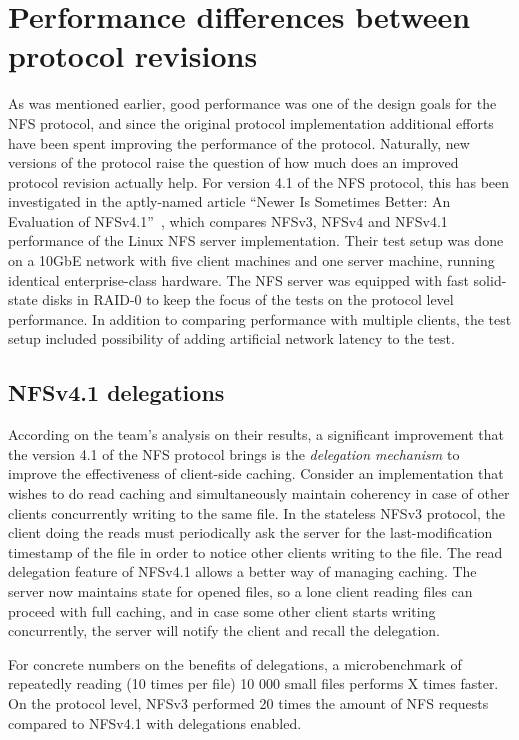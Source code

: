 \section{Performance differences between protocol revisions} \label{sect:NFSv41}

As was mentioned earlier, good performance was one of the design goals for the NFS protocol,
and since the original protocol implementation additional efforts have been spent improving the performance of the protocol.
Naturally, new versions of the protocol raise the question of how much does an improved protocol revision actually help.
For version 4.1 of the NFS protocol, this has been investigated in the aptly-named article ``Newer Is Sometimes Better: An Evaluation of NFSv4.1''~\cite{NFSv4Better}, which compares NFSv3, NFSv4 and NFSv4.1 performance of the Linux NFS server implementation.
Their test setup was done on a 10GbE network with five client machines and one server machine, running identical enterprise-class hardware.
The NFS server was equipped with fast solid-state disks in RAID-0 to keep the focus of the tests on the protocol level performance.
In addition to comparing performance with multiple clients, the test setup included possibility of adding artificial network latency to the test.

\subsection{NFSv4.1 delegations}
According on the team's analysis on their results, a significant improvement that the version 4.1 of the NFS protocol brings is the \emph{delegation
mechanism} to improve the effectiveness of client-side caching.
Consider an implementation that wishes to do read caching and simultaneously maintain coherency in case of other clients
concurrently writing to the same file.
In the stateless NFSv3 protocol, the client doing the reads must periodically ask the server for the last-modification timestamp of the file in order to notice other clients writing to the file.
The read delegation feature of NFSv4.1 allows a better way of managing caching.
The server now maintains state for opened files, so a lone client reading files can proceed with full caching,
and in case some other client starts writing concurrently, the server will notify the client and recall the delegation.

For concrete numbers on the benefits of delegations, a microbenchmark of repeatedly reading (10 times per file) 10 000 small files performs X times faster.
On the protocol level, NFSv3 performed 20 times the amount of NFS requests compared to NFSv4.1 with delegations enabled.

